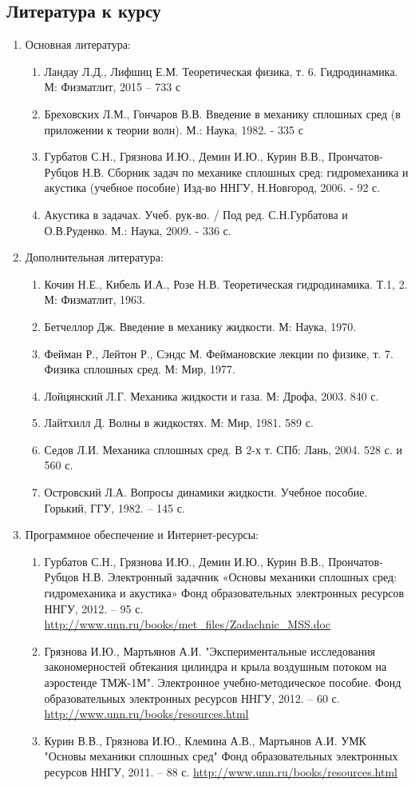 \subsection{Литература к курсу}
\begin{enumerate}
\item Основная литература:
	\begin{enumerate}
		\item Ландау Л.Д., Лифшиц Е.М. Теоретическая физика, т. 6. Гидродинамика. М:  Физматлит, 2015 – 733 с
		\item Бреховских Л.М., Гончаров В.В. Введение в механику сплошных сред (в приложении к теории волн). М.: Наука, 1982. - 335 с
		\item Гурбатов С.Н., Грязнова И.Ю., Демин И.Ю., Курин В.В., Прончатов-Рубцов Н.В. Сборник задач по механике сплошных сред: гидромеханика и акустика (учебное пособие) Изд-во ННГУ, Н.Новгород, 2006. - 92 с.
		\item Акустика в задачах. Учеб. рук-во. / Под ред. С.Н.Гурбатова и О.В.Руденко. М.: Наука, 2009. - 336 с.
	\end{enumerate}
\item Дополнительная литература:
	\begin{enumerate}
		\item Кочин Н.Е., Кибель И.А., Розе Н.В. Теоретическая гидродинамика. Т.1, 2. М: Физматлит, 1963.
		\item Бетчеллор Дж. Введение в механику жидкости. М: Наука, 1970. 
		\item Фейман Р., Лейтон Р., Сэндс М. Феймановские лекции по физике, т. 7. Физика сплошных сред. М: Мир, 1977.
		\item Лойцянский Л.Г. Механика жидкости и газа. М: Дрофа, 2003. 840 с.
		\item Лайтхилл Д. Волны в жидкостях. М: Мир, 1981. 589 с.
		\item Седов Л.И. Механика сплошных сред. В 2-х т. СПб: Лань, 2004. 528 с. и 560 с.
		\item Островский Л.А. Вопросы динамики жидкости. Учебное пособие. Горький, ГГУ, 1982. – 145 с.
	\end{enumerate}
\item Программное обеспечение и Интернет-ресурсы:
	\begin{enumerate}
		\item Гурбатов С.Н., Грязнова И.Ю., Демин И.Ю., Курин В.В., Прончатов-Рубцов Н.В.  Электронный задачник «Основы механики сплошных сред: гидромеханика и акустика»  Фонд образовательных электронных ресурсов ННГУ, 2012. – 95 с. \url{http://www.unn.ru/books/met_files/Zadachnic_MSS.doc}
		\item Грязнова И.Ю., Мартьянов А.И. "Экспериментальные исследования закономерностей обтекания цилиндра и крыла воздушным потоком на аэростенде ТМЖ-1М". Электронное учебно-методическое пособие.  Фонд образовательных электронных ресурсов ННГУ, 2012. – 60 с. \url{http://www.unn.ru/books/resources.html}
		\item Курин В.В., Грязнова И.Ю., Клемина А.В., Мартьянов А.И. УМК "Основы механики сплошных сред" Фонд образовательных электронных ресурсов ННГУ, 2011. – 88 с. \url{http://www.unn.ru/books/resources.html}
	\end{enumerate}
\end{enumerate}
